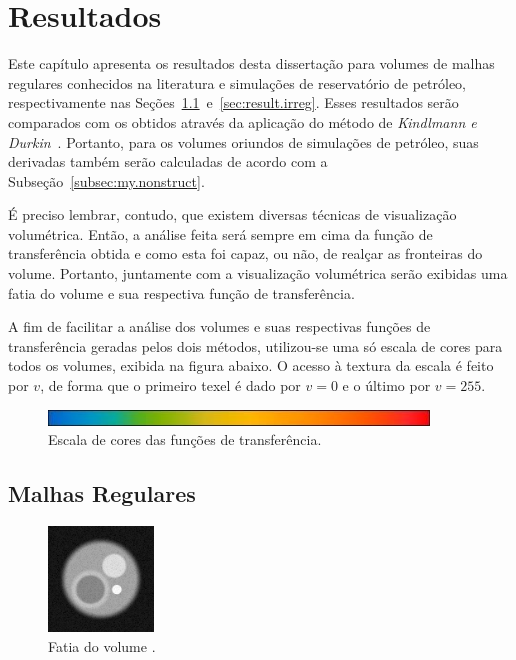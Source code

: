 
\chapter{Resultados}
\label{ch:result}

	Este capítulo apresenta os resultados desta dissertação para volumes de malhas regulares conhecidos na literatura e simulações de reservatório de petróleo, respectivamente nas Seções~\ref{sec:result.reg}~e~\ref{sec:result.irreg}. Esses resultados serão comparados com os obtidos através da aplicação do método de \textit{Kindlmann e Durkin}~\cite{gordon}. Portanto, para os volumes oriundos de simulações de petróleo, suas derivadas também serão calculadas de acordo com a Subseção~\ref{subsec:my.nonstruct}.
	
	É preciso lembrar, contudo, que existem diversas técnicas de visualização volumétrica. Então, a análise feita será sempre em cima da função de transferência obtida e como esta foi capaz, ou não, de realçar as fronteiras do volume. Portanto, juntamente com a visualização volumétrica serão exibidas uma fatia do volume e sua respectiva função de transferência.
	
	A fim de facilitar a análise dos volumes e suas respectivas funções de transferência geradas pelos dois métodos, utilizou-se uma só escala de cores para todos os volumes, exibida na figura abaixo. O acesso à textura da escala é feito por $ v $, de forma que o primeiro texel é dado por $ v = 0 $ e o último por $ v = 255 $.

\begin{figure}[h]
	\centering
	\includegraphics[width=0.9\textwidth]{images/r_colorscale}
	\caption{Escala de cores das funções de transferência.}
\end{figure}
	
\section{Malhas Regulares}
\label{sec:result.reg}

\begin{figure}[h]
	\centering
	\includegraphics[width=0.25\textwidth]{images/r_3sphere_slice}
	\caption{Fatia do volume .}
\end{figure}

